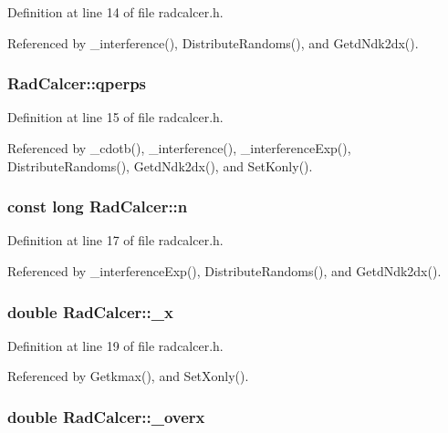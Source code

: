 Definition at line 14 of file radcalcer.h.

Referenced by \_\-interference(), DistributeRandoms(), and GetdNdk2dx().
\subsubsection{ {\bf RadCalcer::qperps}\hspace{0.3cm}{\tt  [private]}}\label{classRadCalcer_4bb0d69b33f9a4cf59c72a53419be16e}




Definition at line 15 of file radcalcer.h.

Referenced by \_\-cdotb(), \_\-interference(), \_\-interferenceExp(), DistributeRandoms(), GetdNdk2dx(), and SetKonly().
\subsubsection{\setlength{\rightskip}{0pt plus 5cm}const long {\bf RadCalcer::n}\hspace{0.3cm}{\tt  [private]}}\label{classRadCalcer_2ef2f781f70d8bc4f21c6dfa8bf164bf}




Definition at line 17 of file radcalcer.h.

Referenced by \_\-interferenceExp(), DistributeRandoms(), and GetdNdk2dx().
\subsubsection{\setlength{\rightskip}{0pt plus 5cm}double {\bf RadCalcer::\_\-x}\hspace{0.3cm}{\tt  [private]}}\label{classRadCalcer_5e9cb8adf3bdf67e854e101aea092a73}




Definition at line 19 of file radcalcer.h.

Referenced by Getkmax(), and SetXonly().
\subsubsection{\setlength{\rightskip}{0pt plus 5cm}double {\bf RadCalcer::\_\-overx}\hspace{0.3cm}{\tt  [private]}}\label{classRadCalcer_e84a98b07e5919fe1591a86967a46bad}




